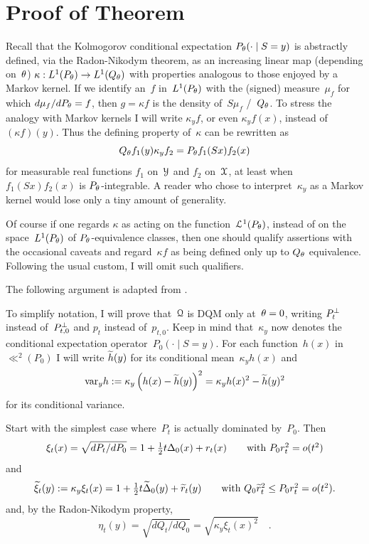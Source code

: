 \documentclass[aos]{imsart}
\def\subheading#1{\medskip\noindent{\normalfont\bfseries #1}}
\theoremstyle{plain}
\theoremstyle{remark}
\begin{document}
%
\section{Proof of Theorem~\protect{\ref{preserveDQM}}}  \label{Proof}
Recall  that the Kolmogorov conditional expectation
$P_\theta(\cdot\mid S=y)$ is abstractly defined, via the
Radon-Nikodym theorem, as an increasing linear map (depending on~$\theta$)
$\kappa:L^1(P_\theta)\to L^1(Q_\theta)$ with properties analogous to those
enjoyed by a Markov kernel. If we identify an~$f$
in~$L^1(P_\theta)$ with the (signed) measure~$\mu_f$ for which
$d\mu_f/dP_\theta=f$, then $g=\kappa f$ is the density of~$S\mu_f$
\wrt/~$Q_\theta$. 
To stress the analogy with Markov kernels I will write $\kappa_y f$, or
even $\kappa_y f(x)$, instead of~$(\kappa f)(y)$. 
Thus the defining property of~$\kappa$ can be rewritten as
\begin{equation}
Q_\theta f_1(y)\kappa_y f_2 = P_\theta f_1(Sx)f_2(x)
\label{Kol}
\end{equation}
for measurable real functions $f_1$ on~${\EuScript Y}$ and $f_2$ on~${\EuScript X}$,
at least when $f_1(Sx)f_2(x)$ is $P_\theta$-integrable.
A reader
who chose to interpret~$\kappa_y$ as a Markov kernel would lose only a
tiny amount of generality.


Of course if one regards $\kappa$ as acting on the function~${\EuScript L}^1(P_\theta)$, instead
of on the space~$L^1(P_\theta)$ of $P_\theta$-equivalence classes, then one
should qualify assertions with the occasional  caveats
and regard~$\kappa f$ as being defined only up to $Q_\theta$ equivalence.
Following the usual custom, I will omit such qualifiers.

\subheading{Proof of assertion~(i).}
The following argument is adapted from
\citet[Appendix~A3]{vaart:88cwi}.



To simplify notation, I will prove that~${\EuScript Q}$ is DQM only at~$\theta=0$,
writing $P^\bot_t$ instead of~$P^\bot_{t,0}$ and $p_t$ instead
of~$p_{t,0}$. Keep in mind that~$\kappa_y$ now denotes the conditional expectation
operator~$P_0(\cdot\mid S=y)$. 
For each function~$h(x)$ in~$\ll^2(P_0)$ I will write $\widetilde h(y)$ for its conditional mean~$\kappa_yh(x)$ and
$$
\hbox{\rm var}_y h := \kappa_y\left(h(x)-\widetilde h(y)\right)^2 = \kappa_y h(x)^2 - \widetilde h(y)^2
$$
for its conditional variance.

Start with the simplest case where~$P_t$ is actually dominated by~$P_0$. Then
$$
\xi_t(x) = \sqrt{{dP_t}/{dP_0}} = 1 +\tfrac12 t\Delta_0(x) + r_t(x)
\qquad\hbox{\rm with $P_0r_t^2 = o(t^2)$}
$$
and
\begin{equation}
\widetilde\xi_t(y) := \kappa_y\xi_t(x) = 1+ \tfrac12 t \widetilde\Delta_0(y) + \widetilde r_t(y)
\qquad\hbox{\rm with $Q_0\widetilde r_t^2 \le P_0 r_t^2= o(t^2)$}.
\label{xitil}
\end{equation}
and, by the Radon-Nikodym property,
$$
\eta_t(y) =\sqrt{{dQ_t}/{dQ_0}} = \sqrt{\kappa_y\xi_t(x)^2}
\quad.
$$
\end{document}
